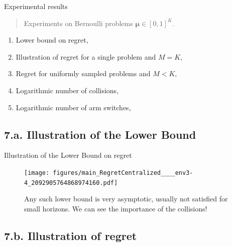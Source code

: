 \documentclass[12pt,english,ignorenonframetext,aspectratio=169,]{beamer}
\providecommand{\tightlist}{%
  \setlength{\itemsep}{0pt}\setlength{\parskip}{0pt}}
\begin{document}
\begin{frame}{Experimental results}

\begin{quote}
Experiments on Bernoulli problems \(\boldsymbol{\mu}\in[0,1]^K\).
\end{quote}

\begin{enumerate}
\def\labelenumi{\arabic{enumi}.}
\tightlist
\item
  Lower bound on regret,\vspace*{15pt}
\item
  Illustration of regret for a single problem and
  \(M = K\),\vspace*{15pt}
\item
  Regret for uniformly sampled problems and \(M < K\),\vspace*{15pt}
\item
  Logarithmic number of collisions,\vspace*{15pt}
\item
  Logarithmic number of arm switches,\vspace*{15pt}
\end{enumerate}

\end{frame}


\subsection{\hfill{}7.a. Illustration of the Lower Bound\hfill{}}

\begin{frame}[plain]{Illustration of the Lower Bound on regret}

\begin{figure}[h!]
\texttt{[image: figures/main\_RegretCentralized\_\_\_\_env3-4\_2092905764868974160.pdf]}
\caption{\footnotesize{Any such lower bound is \alert{very asymptotic}, usually not satisfied for small horizons. We can see the importance of the collisions!}}
\end{figure}

\end{frame}



\subsection{\hfill{}7.b. Illustration of regret\hfill{}}
\end{document}
